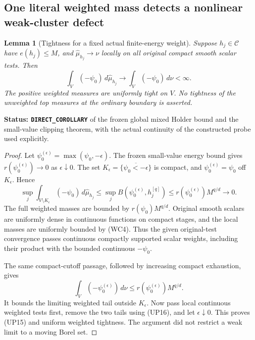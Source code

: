 \documentclass[11pt,a4paper]{article}
\numberwithin{equation}{section}
\newtheorem{lemma}[theorem]{Lemma}
\theoremstyle{definition}
\theoremstyle{remark}
\begin{document}
\subsection{One literal weighted mass detects a nonlinear weak-cluster defect}

\begin{lemma}[Tightness for a fixed actual finite-energy weight]
\label{lem:r12-fixed-probe-weight-tightness}
Suppose $h_j\in\mathcal C$ have $e(h_j)\leq M$, and
$\widehat\mu_{h_j}\to\nu$ locally on all original compact smooth
scalar tests.  Then
\[
       \int_V(-\psi_0)\,d\widehat\mu_{h_j}
                      \longrightarrow\int_V(-\psi_0)\,d\nu<\infty.
 \tag{UP15}
\]
The positive weighted measures are uniformly tight on $V$.
No tightness of the unweighted top measures at the ordinary
boundary is asserted.
\end{lemma}

\noindent\textbf{Status: \texttt{DIRECT\_COROLLARY}} of the frozen
global mixed Holder bound and the small-value clipping theorem,
with the actual continuity of the constructed probe used explicitly.

\begin{proof}
Let $\psi_0^{(\epsilon)}=\max(\psi_0,-\epsilon)$.
The frozen small-value energy bound gives
$r(\psi_0^{(\epsilon)})\to0$ as $\epsilon\downarrow0$.
The set $K_\epsilon=\overline{\{\psi_0<-\epsilon\}}$ is compact,
and $\psi_0^{(\epsilon)}=\psi_0$ off $K_\epsilon$.  Hence
\[
 \sup_j\int_{V\setminus K_\epsilon}(-\psi_0)
                                     \,d\widehat\mu_{h_j}
 \leq\sup_j B(\psi_0^{(\epsilon)},h_j^{[q]})
 \leq r(\psi_0^{(\epsilon)})M^{q/d}\longrightarrow0.
 \tag{UP16}
\]
The full weighted masses are bounded by
$r(\psi_0)M^{q/d}$.  Original smooth scalars are uniformly dense
in continuous functions on compact stages, and the local masses
are uniformly bounded by (WC4).  Thus the given original-test
convergence passes continuous compactly supported scalar weights,
including their product with the bounded continuous $-\psi_0$.

The same compact-cutoff passage, followed by increasing compact
exhaustion, gives
\[
        \int_V(-\psi_0^{(\epsilon)})\,d\nu
                  \leq r(\psi_0^{(\epsilon)})M^{q/d}.
\]
It bounds the limiting weighted tail outside $K_\epsilon$.
Now pass local continuous weighted tests first, remove the two
tails using (UP16), and let $\epsilon\downarrow0$.  This proves
(UP15) and uniform weighted tightness.  The argument did not
restrict a weak limit to a moving Borel set.
\end{proof}
\end{document}
